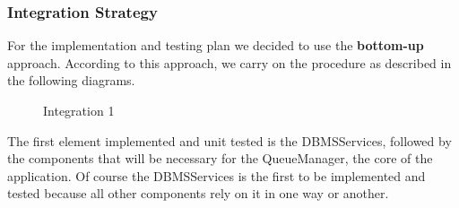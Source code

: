 \subsubsection{Integration Strategy}
For the implementation and testing plan we decided to use the \textbf{bottom-up} approach. According to this approach, we carry on the procedure as described in the following diagrams. 
\begin{figure}[H]
	\noindent
	\caption{Integration 1} 
\end{figure}
The first element implemented and unit tested is the DBMSServices, followed by the components that will be necessary for the QueueManager, the core of the application. Of course the DBMSServices is the first to be implemented and tested because all other components rely on it in one way or another.
